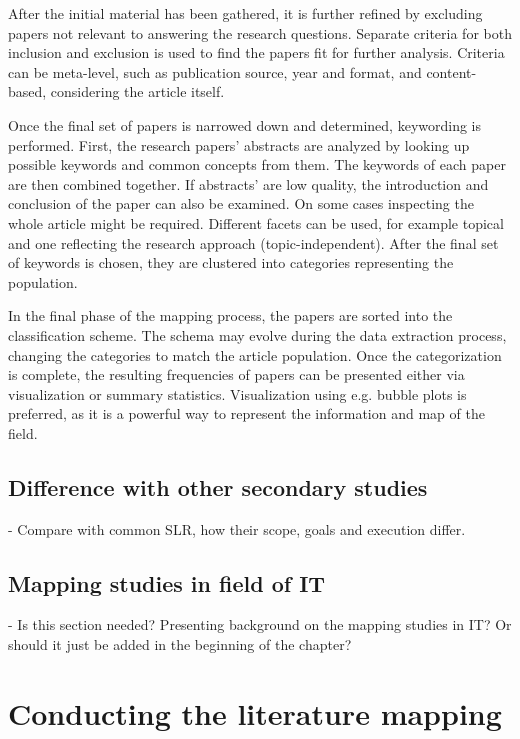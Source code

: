 \documentclass[utf8,english]{gradu3}
\begin{document}
After the initial material has been gathered, it is further refined by excluding
papers not relevant to answering the research questions. Separate criteria for
both inclusion and exclusion is used to find the papers fit for further
analysis. Criteria can be meta-level, such as publication source, year and format,
and content-based, considering the article itself.

Once the final set of papers is narrowed down and determined, keywording is
performed. First, the research papers' abstracts are analyzed by looking up
possible keywords and common concepts from them. The keywords of each paper are
then combined together. If abstracts' are low quality, the introduction and
conclusion of the paper can also be examined. On some cases inspecting the whole
article might be required.  Different facets can be used, for
example topical and one reflecting the research approach (topic-independent). 
After the final set of keywords is chosen, they are clustered into categories
representing the population.

In the final phase of the mapping process, the papers are sorted into the
classification scheme. The schema may evolve during the data extraction process,
changing the categories to match the article population. Once the categorization
is complete, the resulting frequencies of papers can be presented either via
visualization or summary statistics. Visualization using e.g. bubble plots is
preferred, as it is a powerful way to represent the information and map of the
field.


\section{Difference with other secondary studies}

- Compare with common SLR, how their scope, goals and execution differ.

\section{Mapping studies in field of IT}

- Is this section needed? Presenting background on the mapping studies in IT?
Or should it just be added in the beginning of the chapter?

\chapter{Conducting the literature mapping}
\end{document}
